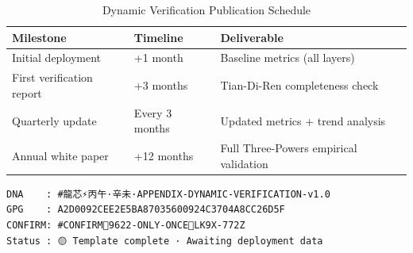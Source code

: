 \begin{table}[h]
\centering
\caption{Dynamic Verification Publication Schedule}
\renewcommand{\arraystretch}{1.3}
\begin{tabular}{lll}
\toprule
\textbf{Milestone} & \textbf{Timeline} & \textbf{Deliverable} \\
\midrule
Initial deployment & +1 month & Baseline metrics (all layers) \\
First verification report & +3 months & Tian-Di-Ren completeness check \\
Quarterly update & Every 3 months & Updated metrics + trend analysis \\
Annual white paper & +12 months & Full Three-Powers empirical validation \\
\bottomrule
\end{tabular}
\end{table}

\begin{small}
\begin{verbatim}
DNA    : #龍芯⚡️丙午·辛未·APPENDIX-DYNAMIC-VERIFICATION-v1.0
GPG    : A2D0092CEE2E5BA87035600924C3704A8CC26D5F
CONFIRM: #CONFIRM🌌9622-ONLY-ONCE🧬LK9X-772Z
Status : 🟡 Template complete · Awaiting deployment data
\end{verbatim}
\end{small}
